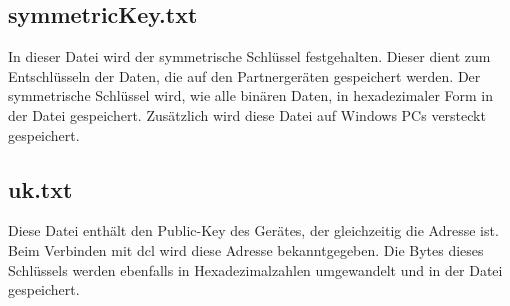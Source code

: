 \subsection{symmetricKey.txt}
In dieser Datei wird der symmetrische Schlüssel festgehalten. Dieser dient zum Entschlüsseln der Daten, die auf den Partnergeräten gespeichert werden. Der symmetrische Schlüssel wird, wie alle binären Daten, in hexadezimaler Form in der Datei gespeichert. Zusätzlich wird diese Datei auf Windows PCs versteckt gespeichert.

\subsection{uk.txt}
Diese Datei enthält den Public-Key des Gerätes, der gleichzeitig die Adresse ist. Beim Verbinden mit \gls{dcl} wird diese Adresse bekanntgegeben. Die Bytes dieses Schlüssels werden ebenfalls in Hexadezimalzahlen umgewandelt und in der Datei gespeichert.
